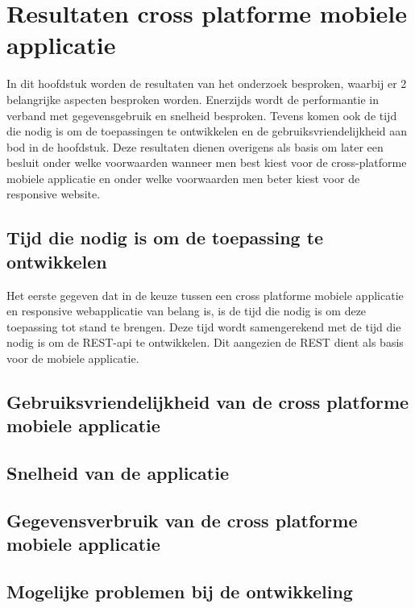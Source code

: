 \chapter{Resultaten cross platforme mobiele applicatie}
\label{ch:resultatencrossplatformapp}
In dit hoofdstuk worden de resultaten van het onderzoek besproken, waarbij er 2 belangrijke aspecten besproken worden.
Enerzijds wordt de performantie in verband met gegevensgebruik en  snelheid besproken.
Tevens komen ook de tijd die nodig is om de toepassingen te ontwikkelen en de gebruiksvriendelijkheid aan bod in de hoofdstuk.
Deze resultaten dienen overigens als basis om later een besluit onder welke voorwaarden wanneer men best kiest voor de
cross-platforme mobiele applicatie en onder welke voorwaarden men beter kiest voor de responsive website.

\section{Tijd die nodig is om de toepassing te ontwikkelen}
Het eerste gegeven dat in de keuze tussen een cross platforme mobiele applicatie en responsive webapplicatie van belang is,
is de tijd die nodig is om deze toepassing tot stand te brengen. Deze tijd wordt samengerekend met de tijd die nodig is om de
REST-api te ontwikkelen. Dit aangezien de REST dient als basis voor de mobiele applicatie.




\section{Gebruiksvriendelijkheid van de cross platforme mobiele applicatie}


\section{Snelheid van de applicatie}


\section{Gegevensverbruik van de cross platforme mobiele applicatie}

\section{Mogelijke problemen bij de ontwikkeling}
